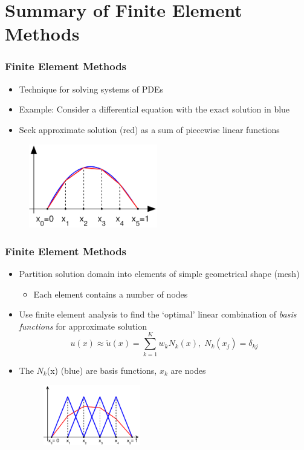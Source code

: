 \documentclass[serif,12pt]{beamer}
\begin{document}
\section{Summary of Finite Element Methods}
\begin{frame}
	\frametitle{Finite Element Methods}
	\begin{itemize}
		\item Technique for solving systems of PDEs
		\item Example: Consider a differential equation with the exact solution in blue
		\item Seek approximate solution (red) as a sum of piecewise linear functions
	\end{itemize}
	\begin{figure}
	    \includegraphics[width=0.50\textwidth]{figures/Finite_element_method_1D_illustration1.png}
	    \let\thefootnote\relax{}
	\end{figure}
\end{frame}

\begin{frame}
\frametitle{Finite Element Methods}
\begin{itemize}
	\item Partition solution domain into elements of simple geometrical shape (mesh)
	\begin{itemize}
		\item Each element contains a number of nodes
	\end{itemize}
	\item Use finite element analysis to find the `optimal' linear combination of \emph{basis functions} for approximate solution
\[u(x) \approx \tilde{u}(x) = \displaystyle\sum_{k=1}^{K}w_k N_k(x), \; N_k(x_j) = \delta_{kj} \]
	\item The $N_k$(x) (blue) are basis functions, $x_k$ are nodes
\begin{figure}
    \includegraphics[width=0.40\textwidth]{figures/Finite_element_method_1D_illustration2.pdf}
    \let\thefootnote\relax{}
\end{figure}
\end{itemize}
\end{frame}
\end{document}
